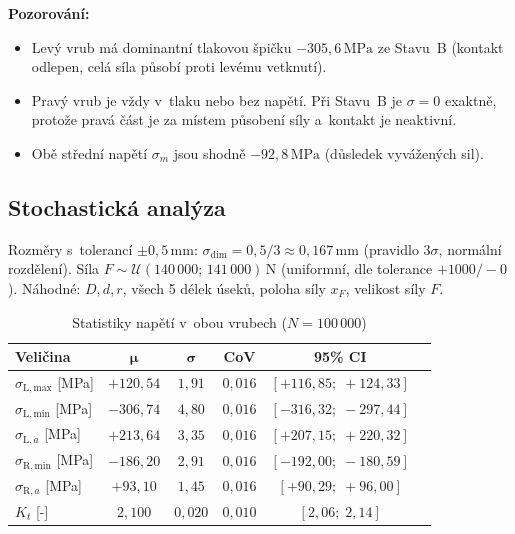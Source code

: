 \documentclass[a4paper,11pt]{article}
\newcommand{\unit}[1]{\,\mathrm{#1}}
\begin{document}
\textbf{Pozorování:}
\begin{itemize}[nosep]
    \item Levý vrub má dominantní tlakovou špičku $-305{,}6\unit{MPa}$ ze Stavu~B (kontakt odlepen, celá síla působí proti levému vetknutí).
    \item Pravý vrub je vždy v~tlaku nebo bez napětí. Při Stavu~B je $\sigma = 0$ exaktně, protože pravá část je za místem působení síly a~kontakt je neaktivní.
    \item Obě střední napětí $\sigma_m$ jsou shodně $-92{,}8\unit{MPa}$ (důsledek vyvážených sil).
\end{itemize}

\subsection{Stochastická analýza}

Rozměry s~tolerancí $\pm 0{,}5\unit{mm}$: $\sigma_{\mathrm{dim}} = 0{,}5/3 \approx 0{,}167\unit{mm}$ (pravidlo $3\sigma$, normální rozdělení). Síla $F \sim \mathcal{U}(140\,000;\,141\,000)\unit{N}$ (uniformní, dle tolerance $+1000/-0$). Náhodné: $D, d, r$, všech 5 délek úseků, poloha síly $x_F$, velikost síly $F$.

\begin{table}[H]
\centering
\caption{Statistiky napětí v~obou vrubech ($N = 100\,000$)}
\begin{tabular}{lccccc}
\toprule
\textbf{Veličina} & $\boldsymbol{\mu}$ & $\boldsymbol{\sigma}$ & \textbf{CoV} & \textbf{95\% CI} \\
\midrule
$\sigma_{\mathrm{L,max}}$ [MPa] & $+120{,}54$ & $1{,}91$ & $0{,}016$ & $[+116{,}85;\; +124{,}33]$ \\
$\sigma_{\mathrm{L,min}}$ [MPa] & $-306{,}74$ & $4{,}80$ & $0{,}016$ & $[-316{,}32;\; -297{,}44]$ \\
$\sigma_{\mathrm{L},a}$    [MPa] & $+213{,}64$ & $3{,}35$ & $0{,}016$ & $[+207{,}15;\; +220{,}32]$ \\
$\sigma_{\mathrm{R,min}}$ [MPa] & $-186{,}20$ & $2{,}91$ & $0{,}016$ & $[-192{,}00;\; -180{,}59]$ \\
$\sigma_{\mathrm{R},a}$    [MPa] & $+93{,}10$  & $1{,}45$ & $0{,}016$ & $[+90{,}29;\; +96{,}00]$ \\
$K_t$ [-] & $2{,}100$ & $0{,}020$ & $0{,}010$ & $[2{,}06;\; 2{,}14]$ \\
\bottomrule
\end{tabular}
\end{table}
\end{document}
